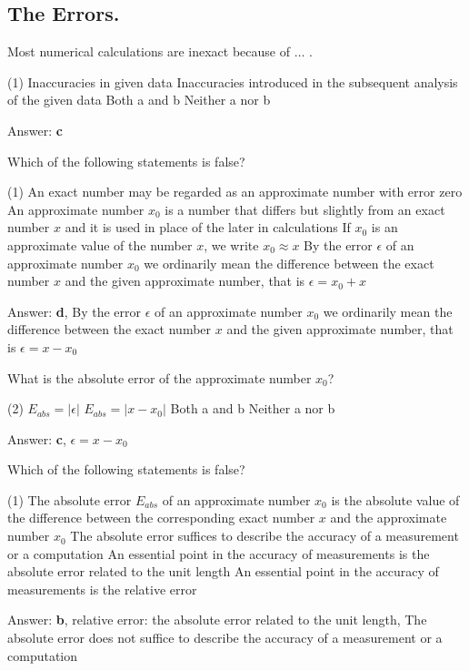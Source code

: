 \documentclass{exam}
\begin{document}
\begin{questions}
	\section{The Errors.}

	\question Most numerical calculations are inexact because of $\dots$ .
	\begin{tasks}(1)
		\task Inaccuracies in given data
		\task Inaccuracies introduced in the subsequent analysis of the given data
		\task Both a and b
		\task Neither a nor b
	\end{tasks}
	Answer: \textbf{c}

	\question Which of the following statements is false?
	\begin{tasks}(1)
		\task An exact number may be regarded as an approximate number with error zero
		\task An approximate number $x_0$ is a number that differs but slightly from an exact number $x$ and it is used in place of the later in calculations
		\task If $x_0$ is an approximate value of the number $x$, we write $x_0 \approx x$
		\task By the error $\epsilon$ of an approximate number $x_0$ we ordinarily mean the difference between the exact number $x$ and the given approximate number, that is $\epsilon = x_0 + x$
	\end{tasks}
	Answer: \textbf{d}, By the error $\epsilon$ of an approximate number $x_0$ we ordinarily mean the difference between the exact number $x$ and the given approximate number, that is $\epsilon = x - x_0$

	\question What is the absolute error of the approximate number $x_0$?
	\begin{tasks}(2)
		\task $E_{abs} = |\epsilon|$
		\task $E_{abs} = |x - x_0|$
		\task Both a and b
		\task Neither a nor b
	\end{tasks}
	Answer: \textbf{c}, $\epsilon = x - x_0$

	\question Which of the following statements is false?
	\begin{tasks}(1)
		\task The absolute error $E_{abs}$ of an approximate number $x_0$ is the absolute value of the difference between the corresponding exact number $x$ and the approximate number $x_0$
		\task The absolute error suffices to describe the accuracy of a measurement or a computation
		\task An essential point in the accuracy of measurements is the absolute error related to the unit length
		\task An essential point in the accuracy of measurements is the relative error
	\end{tasks}
	Answer: \textbf{b}, relative error: the absolute error related to the unit length, The absolute error does not suffice to describe the accuracy of a measurement or a computation


\end{questions}
\end{document}
